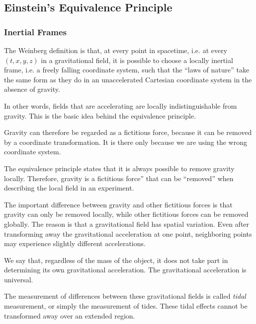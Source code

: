 
\subsection{Einstein's Equivalence Principle}

	\subsubsection{Inertial Frames}

		The Weinberg definition is that, at every point in spacetime, i.e. at every $(t,x,y,z)$ 
		in a gravitational field, it is possible to choose a locally inertial frame, i.e. a freely 
		falling coordinate system, such that the ``laws of nature'' take the same form as they do in 
		an unaccelerated Cartesian coordinate system in the absence of gravity.

		In other words, fields that are accelerating are locally indistinguishable from gravity. 
		This is the basic idea behind the equivalence principle.

		Gravity can therefore be regarded as a fictitious force, because it can be removed by a 
		coordinate transformation. It is there only because we are using the wrong coordinate system.

		The equivalence principle states that it is always possible to remove gravity locally. 
		Therefore, gravity is a fictitious force'' that can be ``removed'' when describing the 
		local field in an experiment.

		The important difference between gravity and other fictitious forces is that gravity can 
		only be removed locally, while other fictitious forces can be removed globally. 
		The reason is that a gravitational field has spatial variation. Even after transforming 
		away the gravitational acceleration at one point, neighboring points may experience 
		slightly different accelerations.

		We say that, regardless of the mass of the object, it does not take part in determining 
		its own gravitational acceleration. The gravitational acceleration is universal.

		The measurement of differences between these gravitational fields is called \textit{tidal} measurement, 
		or simply the measurement of tides. These tidal effects cannot be transformed away over an extended 
		region.

